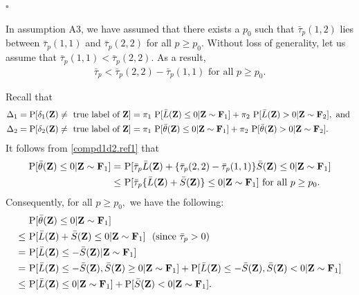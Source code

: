 \documentclass[twoside]{article}
\newcommand{\bZ}{\mathbf{Z}}
\newcommand{\bF}{\mathbf{F}}
\newcommand{\0}{\mathbf{0}}
\newcommand{\1}{\mathbf{1}}
\newcommand*{\QEDB}{\hfill\ensuremath{\square}}
\numberwithin{equation}{section}
\begin{document}
\hfill\QEDB\newline



\noindent In assumption A3, we have assumed that there exists a $p_0$ such that $\bar{\tau}_p(1,2)$ lies between $\bar{\tau}_p(1,1)$ and $\bar{\tau}_p(2,2)$ for all $p\ge p_0.$ Without loss of generality, let us assume that $\bar{\tau}_p(1,1)<\bar{\tau}_p(2,2).$ As a result,
\begin{align}\label{compd1d2.ref1}
 \bar{\tau}_p<\bar{\tau}_p(2,2)-\bar{\tau}_p(1,1)\text{ for all }p\ge p_0.
\end{align}

Recall that
\begin{align*}
 &\Delta_{1} = {\rm P}[\delta_{1}(\bZ)\neq \text{ true label of }\bZ]
=\pi_1\ {\rm P}[\bar{L}(\bZ)\leq 0|\bZ\sim \bF_1] + \pi_2\ {\rm P}[\bar{L}(\bZ)> 0|\bZ\sim \bF_2],\text{ and }\\
&\Delta_{2} = {\rm P}[\delta_{2}(\bZ)\neq \text{ true label of }\bZ]
=\pi_1\ {\rm P}[\bar{\theta}(\bZ)\leq 0|\bZ\sim \bF_1] + \pi_2\ {\rm P}[\bar{\theta}(\bZ)> 0|\bZ\sim \bF_2].
\end{align*}
\noindent It follows from \eqref{compd1d2.ref1} that
\begin{align*}
 {\rm P}[\bar{\theta}(\bZ)\leq 0|\bZ \sim \bF_1]
=&\ {\rm P}[\bar{\tau}_p\bar{L}(\bZ)+\{\bar{\tau}_p(2,2)-\bar{\tau}_p(1,1)\}\bar{S}(\bZ)\leq 0|\bZ\sim \bF_1] \\
\leq &\  {\rm P}[\bar{\tau}_p\{\bar{L}(\bZ)+\bar{S}(\bZ)\}\leq 0|\bZ\sim \bF_1]\ \text{for all }p\ge p_0.
\end{align*}
Consequently, for all $p\ge p_0,$ we have the following:
\begin{align}\label{thm3.5}
&\ {\rm P}[\bar{\theta}(\bZ)\leq 0|\bZ \sim \bF_1]\nonumber \\
\leq &\ {\rm P}[\bar{L}(\bZ)+\bar{S}(\bZ)\leq 0|\bZ\sim \bF_1]\ \ (\text{since }\bar{\tau}_p>0)\nonumber \\
=&\ {\rm P}[\bar{L}(\bZ)\leq -\bar{S}(\bZ) |\bZ\sim \bF_1]\nonumber \\
=&\ {\rm P}[\bar{L}(\bZ)\leq -\bar{S}(\bZ), \bar{S}(\bZ)\ge 0 |\bZ\sim \bF_1]+{\rm P}[\bar{L}(\bZ)\leq -\bar{S}(\bZ), \bar{S}(\bZ)< 0 |\bZ\sim \bF_1]\nonumber \\
\le &\ {\rm P}[\bar{L}(\bZ)\leq  0 |\bZ\sim \bF_1]+{\rm P}[\bar{S}(\bZ)< 0 |\bZ\sim \bF_1].
\end{align}
\end{document}

